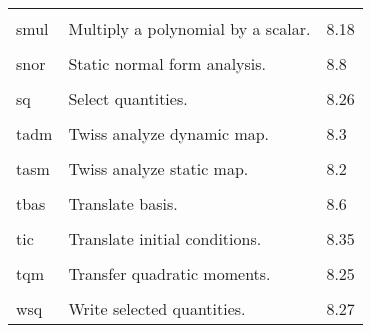 \begin{center}
\begin{tabular}{lll}
\vspace{-3mm}& &\\
\hspace{1.5em}smul    &      Multiply a polynomial by a scalar.   & \hspace{2em}8.18\\
\vspace{-3mm}& &\\
\hspace{1.5em}snor    &           Static normal form analysis.   &  \hspace{2em}8.8\\
\vspace{-3mm}& &\\
\hspace{1.5em}sq      &           Select quantities.       &      \hspace{2em}8.26\\
\vspace{-3mm}& &\\
\hspace{1.5em}tadm    &           Twiss analyze dynamic map.     &  \hspace{2em}8.3\\
\vspace{-3mm}& &\\
\hspace{1.5em}tasm    &           Twiss analyze static map.      &  \hspace{2em}8.2\\
\vspace{-3mm}& &\\
\hspace{1.5em}tbas    &           Translate basis.               &  \hspace{2em}8.6\\
\vspace{-3mm}& &\\
\hspace{1.5em}tic     &    Translate initial conditions.         &  \hspace{2em}8.35\\
\vspace{-3mm}& &\\
\hspace{1.5em}tqm  & Transfer quadratic moments. & \hspace{2em}8.25\\
\vspace{-3mm}& &\\
\hspace{1.5em}wsq     &           Write selected quantities.  &    \hspace{2em}8.27
\end{tabular}
\end{center}

